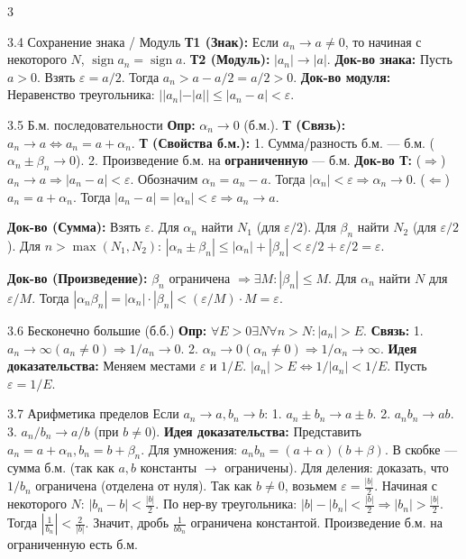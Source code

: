 \documentclass[8pt, a4paper, landscape]{extarticle}
\newcommand{\Ra}{\Rightarrow}
\newcommand{\eps}{\varepsilon}
\DeclareMathOperator{\sign}{sign}
\begin{document}
\begin{multicols*}{3}
\begin{ticket}{3.4 Сохранение знака / Модуль}
\textbf{Т1 (Знак):} Если $a_n \to a \ne 0$, то начиная с некоторого $N$, $\sign a_n = \sign a$.
\textbf{Т2 (Модуль):} $|a_n| \to |a|$.
\tcblower
\textbf{Док-во знака:}
Пусть $a > 0$. Взять $\eps = a/2$.
Тогда $a_n > a - a/2 = a/2 > 0$.
\textbf{Док-во модуля:}
Неравенство треугольника: $||a_n| - |a|| \le |a_n - a| < \eps$.
\end{ticket}


\begin{ticket}{3.5 Б.м. последовательности}
\textbf{Опр:} $\alpha_n \to 0$ (б.м.).
\textbf{Т (Связь):} $a_n \to a \iff a_n = a + \alpha_n$.
\textbf{Т (Свойства б.м.):}
1. Сумма/разность б.м. — б.м. ($\alpha_n \pm \beta_n \to 0$).
2. Произведение б.м. на \textbf{ограниченную} — б.м.
\tcblower
\textbf{Док-во Т:}
($\Ra$) $a_n \to a \Ra |a_n - a| < \eps$. Обозначим $\alpha_n = a_n - a$. Тогда $|\alpha_n| < \eps \Ra \alpha_n \to 0$.
($\Leftarrow$) $a_n = a + \alpha_n$. Тогда $|a_n - a| = |\alpha_n| < \eps \Ra a_n \to a$.

\textbf{Док-во (Сумма):}
Взять $\eps$. Для $\alpha_n$ найти $N_1$ (для $\eps/2$). Для $\beta_n$ найти $N_2$ (для $\eps/2$).
Для $n > \max(N_1, N_2)$:
$|\alpha_n \pm \beta_n| \le |\alpha_n| + |\beta_n| < \eps/2 + \eps/2 = \eps$.

\textbf{Док-во (Произведение):}
$\beta_n$ ограничена $\Ra \exists M: |\beta_n| \le M$.
Для $\alpha_n$ найти $N$ для $\eps/M$.
Тогда $|\alpha_n \beta_n| = |\alpha_n| \cdot |\beta_n| < (\eps/M) \cdot M = \eps$.
\end{ticket}

\begin{ticket}{3.6 Бесконечно большие (б.б.)}
\textbf{Опр:} $\forall E>0 \exists N \forall n>N: |a_n| > E$.
\textbf{Связь:}
1. $a_n \to \infty (a_n \ne 0) \Ra 1/a_n \to 0$.
2. $\alpha_n \to 0 (\alpha_n \ne 0) \Ra 1/\alpha_n \to \infty$.
\tcblower
\textbf{Идея доказательства:}
Меняем местами $\eps$ и $1/E$.
$|a_n| > E \iff 1/|a_n| < 1/E$.
Пусть $\eps = 1/E$.
\end{ticket}

\begin{ticket}{3.7 Арифметика пределов}
Если $a_n \to a, b_n \to b$:
1. $a_n \pm b_n \to a \pm b$.
2. $a_n b_n \to ab$.
3. $a_n/b_n \to a/b$ (при $b \ne 0$).
\tcblower
\textbf{Идея доказательства:}
Представить $a_n = a + \alpha_n, b_n = b + \beta_n$.
Для умножения:
$a_n b_n = (a+\alpha)(b+\beta)$.
В скобке — сумма б.м. (так как $a, b$ константы $\to$ ограничены).
Для деления: доказать, что $1/b_n$ ограничена (отделена от нуля).
Так как $b \ne 0$, возьмем $\varepsilon = \frac{|b|}{2}$.
Начиная с некоторого $N$: $|b_n - b| < \frac{|b|}{2}$.
По нер-ву треугольника: $|b| - |b_n| < \frac{|b|}{2} \Ra |b_n| > \frac{|b|}{2}$.
Тогда $\left|\frac{1}{b_n}\right| < \frac{2}{|b|}$.
Значит, дробь $\frac{1}{b b_n}$ ограничена константой.
Произведение б.м. на ограниченную есть б.м.
\end{ticket}


\end{multicols*}
\end{document}
